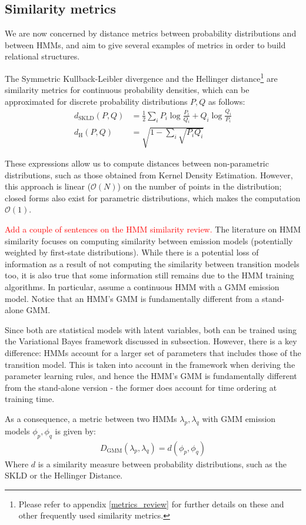 \documentclass[pdftex,11pt,a4paper]{article}
\theoremstyle{definition}
\theoremstyle{remark}
\begin{document}
\subsection{Similarity metrics}
We are now concerned by distance metrics between probability distributions and between HMMs, and aim to give several examples of metrics in order to build relational structures.
\par The Symmetric Kullback-Leibler divergence and the Hellinger distance\footnote{Please refer to appendix \ref{metrics_review} for further details on these and other frequently used similarity metrics.} are similarity metrics for continuous probability densities, which can be approximated for discrete probability distributions $P, Q$ as follows:
\begin{align*}
d_{\text{SKLD}}(P, Q) &= \frac{1}{2}\sum_iP_i\log{\frac{P_i}{Q_i}} + Q_i\log{\frac{Q_i}{P_i}}\\
d_{\text{H}}(P, Q) &= \sqrt{1 - \sum_i \sqrt{P_iQ_i}}
\end{align*}
\par These expressions allow us to compute distances between non-parametric distributions, such as those obtained from Kernel Density Estimation. However, this approach is linear ($\mathcal{O}(N)$) on the number of points in the distribution; closed forms also exist for parametric distributions, which makes the computation $\mathcal{O}(1)$. 
\par \textcolor{red}{Add a couple of sentences on the HMM similarity review.} The literature on HMM similarity focuses on computing similarity between emission models (potentially weighted by first-state distributions). While there is a potential loss of information as a result of not computing the similarity between transition models too, it is also true that some information still remains due to the HMM training algorithms. In particular, assume a continuous HMM with a GMM emission model. Notice that an HMM's GMM is fundamentally different from a stand-alone GMM.
\par Since both are statistical models with latent variables, both can be trained using the Variational Bayes framework discussed in subsection. However, there is a key difference: HMMs account for a larger set of parameters that includes those of the transition model. This is taken into account in the framework when deriving the parameter learning rules, and hence the HMM's GMM is fundamentally different from the stand-alone version - the former does account for time ordering at training time.
\par As a consequence, a metric between two HMMs $\lambda_p, \lambda_q$ with GMM emission models $\phi_p, \phi_q$ is given by:
\begin{align*}
D_{\text{GMM}}(\lambda_p, \lambda_q) = d( \phi_p, \phi_q )
\end{align*}
Where $d$ is a similarity measure between probability distributions, such as the SKLD or the Hellinger Distance.
\end{document}
